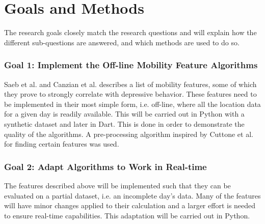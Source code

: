 \section{Goals and Methods}


The research goals closely match the research questions and will explain how the different sub-questions are answered, and which methods are used to do so.

\subsubsection*{Goal 1: Implement the Off-line Mobility Feature Algorithms}
Saeb et al. \cite{Saeb2015} and Canzian et al. \cite{Canzian2015} describes a list of mobility features, some of which they prove to strongly correlate with depressive behavior. These features need to be implemented in their most simple form, i.e. off-line, where all the location data for a given day is readily available. This will be carried out in Python with a synthetic dataset and later in Dart. This is done in order to demonstrate the quality of the algorithms. A pre-processing algorithm inspired by Cuttone et al. \cite{sparse-location-2014} for finding certain features was used.

\subsubsection*{Goal 2: Adapt Algorithms to Work in Real-time}
The features described above will be implemented such that they can be evaluated on a partial dataset, i.e. an incomplete day's data. Many of the features will have minor changes applied to their calculation and a larger effort is needed to ensure real-time capabilities. This adaptation will be carried out in Python.

